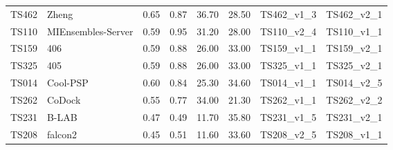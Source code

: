 \begin{table}[ht]
{\begin{tabular}{llllllll}
TS462 & Zheng & 0.65 & 0.87 & 36.70 & 28.50 & TS462\_v1\_3 & TS462\_v2\_1 \\ 
TS110 & MIEnsembles-Server & 0.59 & 0.95 & 31.20 & 28.00 & TS110\_v2\_4 & TS110\_v1\_1 \\ 
TS159 & 406 & 0.59 & 0.88 & 26.00 & 33.00 & TS159\_v1\_1 & TS159\_v2\_1 \\ 
TS325 & 405 & 0.59 & 0.88 & 26.00 & 33.00 & TS325\_v1\_1 & TS325\_v2\_1 \\ 
TS014 & Cool-PSP & 0.60 & 0.84 & 25.30 & 34.60 & TS014\_v1\_1 & TS014\_v2\_5 \\ 
TS262 & CoDock & 0.55 & 0.77 & 34.00 & 21.30 & TS262\_v1\_1 & TS262\_v2\_2 \\ 
TS231 & B-LAB & 0.47 & 0.49 & 11.70 & 35.80 & TS231\_v1\_5 & TS231\_v2\_1 \\ 
TS208 & falcon2 & 0.45 & 0.51 & 11.60 & 33.60 & TS208\_v2\_5 & TS208\_v1\_1 \\ 
\bottomrule
\end{tabular}%
}
\end{table}
